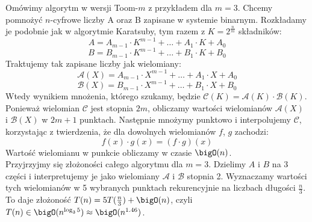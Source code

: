 Omówimy algorytm w wersji Toom-\(m\) z przykładem dla \( m = 3 \). Chcemy pomnożyć \(n\)-cyfrowe liczby A oraz B zapisane w systemie binarnym.
Rozkładamy je podobnie jak w algorytmie Karatsuby, tym razem z \( K = 2^{\frac{n}{m}} \) składników:
\[
    A = A_{m-1} \cdot K^{m-1} + \dots + A_1 \cdot K + A_0
\]
\[
    B = B_{m-1} \cdot K^{m-1} + \dots + B_1 \cdot K + B_0
\]
Traktujemy tak zapisane liczby jak wielomiany:
\[
    \mathcal{A}(X) = A_{m-1} \cdot X^{m-1} + \dots + A_1 \cdot X + A_0
\]
\[
    \mathcal{B}(X) = B_{m-1} \cdot X^{m-1} + \dots + B_1 \cdot X + B_0
\]
Wtedy wynikiem mnożenia, którego szukamy, będzie \( \mathcal{C}(K) = \mathcal{A}(K) \cdot \mathcal{B}(K) \). Ponieważ wielomian \( \mathcal{C} \) jest stopnia \( 2m \), obliczamy wartości wielomianów \( \mathcal{A}(X) \) i \( \mathcal{B}(X) \) w \( 2m+1 \) punktach.
Następnie mnożymy punktowo i interpolujemy \( \mathcal{C} \), korzystając z twierdzenia, że dla dowolnych wielomianów \( f \), \( g \) zachodzi:
\[
    f(x) \cdot g(x) = (f \cdot g)(x)
\]
Wartość wielomianu w punkcie obliczamy w czasie \( \bigO(n) \). \\
Przyjrzyjmy się złożoności całego algorytmu dla \( m = 3 \). Dzielimy \( A \) i \( B \) na 3 części i interpretujemy je jako wielomiany \( \mathcal{A} \) i \( \mathcal{B} \) stopnia 2. Wyznaczamy wartości tych wielomianów w 5 wybranych punktach rekurencyjnie na liczbach długości \( \frac{n}{3} \). To daje złożoność \( T(n) = 5T(\frac{n}{3}) + \bigO(n) \), czyli \( T(n) \in \bigO(n^{\log_3 5}) \approx \bigO(n^{1.46}) \).


